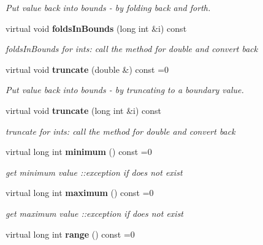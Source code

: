 \begin{CompactItemize}
\begin{CompactList}\small\item\em Put value back into bounds - by folding back and forth. \item\end{CompactList}\item 
virtual void {\bf folds\-In\-Bounds} (long int \&i) const \label{classeo_int_bounds_a7}

\begin{CompactList}\small\item\em folds\-In\-Bounds for ints: call the method for double and convert back \item\end{CompactList}\item 
virtual void {\bf truncate} (double \&) const =0\label{classeo_int_bounds_a8}

\begin{CompactList}\small\item\em Put value back into bounds - by truncating to a boundary value. \item\end{CompactList}\item 
virtual void {\bf truncate} (long int \&i) const \label{classeo_int_bounds_a9}

\begin{CompactList}\small\item\em truncate for ints: call the method for double and convert back \item\end{CompactList}\item 
virtual long int {\bf minimum} () const =0\label{classeo_int_bounds_a10}

\begin{CompactList}\small\item\em get minimum value ::exception if does not exist \item\end{CompactList}\item 
virtual long int {\bf maximum} () const =0\label{classeo_int_bounds_a11}

\begin{CompactList}\small\item\em get maximum value ::exception if does not exist \item\end{CompactList}\item 
virtual long int {\bf range} () const =0\label{classeo_int_bounds_a12}


\end{CompactItemize}
